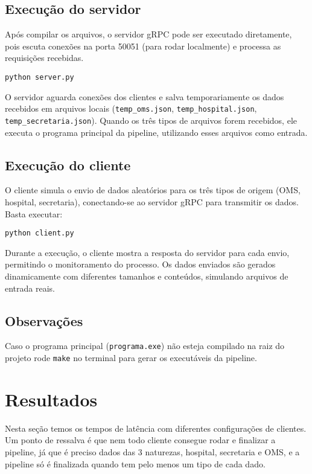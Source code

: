 \documentclass{article}
\begin{document}
\subsection{Execução do servidor}

Após compilar os arquivos, o servidor gRPC pode ser executado diretamente, pois escuta conexões na porta 50051 (para rodar localmente) e processa as requisições recebidas.

\begin{verbatim}
python server.py
\end{verbatim}

O servidor aguarda conexões dos clientes e salva temporariamente os dados recebidos em arquivos locais (\texttt{temp\_oms.json}, \texttt{temp\_hospital.json}, \texttt{temp\_secretaria.json}). Quando os três tipos de arquivos forem recebidos, ele executa o programa principal da pipeline, utilizando esses arquivos como entrada.

\subsection{Execução do cliente}

O cliente simula o envio de dados aleatórios para os três tipos de origem (OMS, hospital, secretaria), conectando-se ao servidor gRPC para transmitir os dados. Basta executar:

\begin{verbatim}
python client.py
\end{verbatim}

Durante a execução, o cliente mostra a resposta do servidor para cada envio, permitindo o monitoramento do processo. Os dados enviados são gerados dinamicamente com diferentes tamanhos e conteúdos, simulando arquivos de entrada reais.


\subsection{Observações}

Caso o programa principal (\texttt{programa.exe}) não esteja compilado na raiz do projeto rode \texttt{make} no terminal para gerar os executáveis da pipeline.


\section{Resultados}

Nesta seção temos os tempos de latência com diferentes configurações de clientes. Um ponto de ressalva é que nem todo cliente consegue rodar e finalizar a pipeline, já que é preciso dados das 3 naturezas, hospital, secretaria e OMS, e a pipeline só é finalizada quando tem pelo menos um tipo de cada dado.
\end{document}
